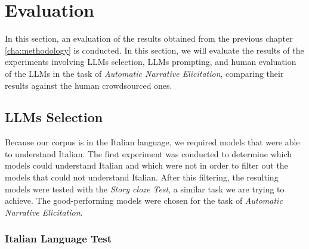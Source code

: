 \chapter{Evaluation}
\label{cha:evaluation}

In this section, an evaluation of the results obtained from the previous chapter \ref{cha:methodology} is conducted. In this section, we will evaluate the results of the experiments involving LLMs selection, LLMs prompting, and human evaluation of the LLMs in the task of \emph{Automatic Narrative Elicitation}, comparing their results against the human crowdsourced ones.

\section{LLMs Selection}
\label{cha:evaluation-LLMs-selection}

Because our corpus is in the Italian language, we required models that were able to understand Italian. The first experiment was conducted to determine which models could understand Italian and which were not in order to filter out the models that could not understand Italian. After this filtering, the resulting models were tested with the \emph{Story cloze Test}, a similar task we are trying to achieve. The good-performing models were chosen for the task of \emph{Automatic Narrative Elicitation}.

\subsection{Italian Language Test}

